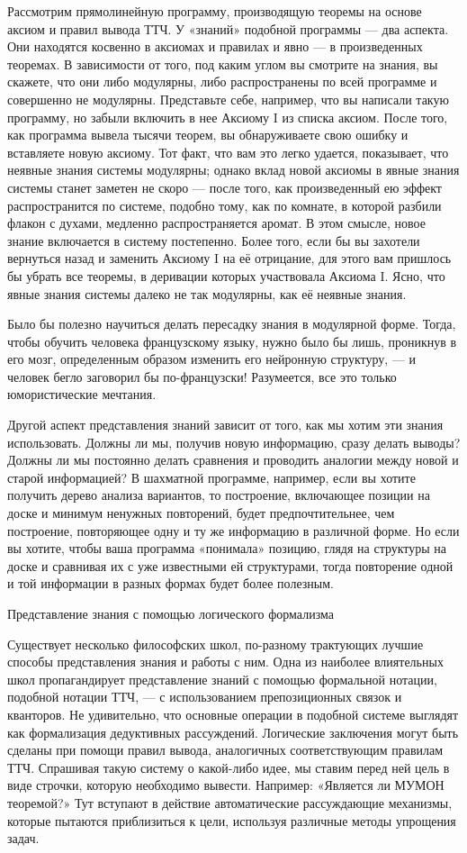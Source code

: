 \documentclass[../main.tex]{subfiles}
\begin{document}
Рассмотрим прямолинейную программу, производящую теоремы на основе аксиом и правил вывода ТТЧ\@. У «знаний» подобной программы --- два аспекта. Они находятся косвенно в аксиомах и правилах и явно --- в произведенных теоремах. В зависимости от того, под каким углом вы смотрите на знания, вы скажете, что они либо модулярны, либо распространены по всей программе и совершенно не модулярны. Представьте себе, например, что вы написали такую программу, но забыли включить в нее Аксиому I из списка аксиом. После того, как программа вывела тысячи теорем, вы обнаруживаете свою ошибку и вставляете новую аксиому. Тот факт, что вам это легко удается, показывает, что неявные знания системы модулярны; однако вклад новой аксиомы в явные знания системы станет заметен не скоро --- после того, как произведенный ею эффект распространится по системе, подобно тому, как по комнате, в которой разбили флакон с духами, медленно распространяется аромат. В этом смысле, новое знание включается в систему постепенно. Более того, если бы вы захотели вернуться назад и заменить Аксиому I на её отрицание, для этого вам пришлось бы убрать все теоремы, в деривации которых участвовала Аксиома I. Ясно, что явные знания системы далеко не так модулярны, как её неявные знания.

Было бы полезно научиться делать пересадку знания в модулярной форме. Тогда, чтобы обучить человека французскому языку, нужно было бы лишь, проникнув в его мозг, определенным образом изменить его нейронную структуру, --- и человек бегло заговорил бы по-французски! Разумеется, все это только юмористические мечтания.

Другой аспект представления знаний зависит от того, как мы хотим эти знания использовать. Должны ли мы, получив новую информацию, сразу делать выводы? Должны ли мы постоянно делать сравнения и проводить аналогии между новой и старой информацией? В шахматной программе, например, если вы хотите получить дерево анализа вариантов, то построение, включающее позиции на доске и минимум ненужных повторений, будет предпочтительнее, чем построение, повторяющее одну и ту же информацию в различной форме. Но если вы хотите, чтобы ваша программа «понимала» позицию, глядя на структуры на доске и сравнивая их с уже известными ей структурами, тогда повторение одной и той информации в разных формах будет более полезным.

Представление знания с помощью логического формализма

Существует несколько философских школ, по-разному трактующих лучшие способы представления знания и работы с ним. Одна из наиболее влиятельных школ пропагандирует представление знаний с помощью формальной нотации, подобной нотации ТТЧ, --- с использованием препозиционных связок и кванторов. Не удивительно, что основные операции в подобной системе выглядят как формализация дедуктивных рассуждений. Логические заключения могут быть сделаны при помощи правил вывода, аналогичных соответствующим правилам ТТЧ\@. Спрашивая такую систему о какой-либо идее, мы ставим перед ней цель в виде строчки, которую необходимо вывести. Например: «Является ли МУМОН теоремой?» Тут вступают в действие автоматические рассуждающие механизмы, которые пытаются приблизиться к цели, используя различные методы упрощения задач.
\end{document}
